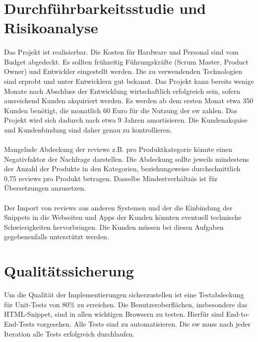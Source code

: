 \documentclass{article}
\begin{document}
\section{Durchführbarkeitsstudie und Risikoanalyse}
\paragraph{}
Das Projekt ist realisierbar. Die Kosten für Hardware und Personal sind vom Budget abgedeckt. Es sollten frühzeitig Führungskräfte (Scrum Master, Product Owner) und Entwickler eingestellt werden. Die zu verwendenden Technologien sind erprobt und unter Entwicklern gut bekannt. Das Projekt kann bereits wenige Monate nach Abschluss der Entwicklung wirtschaftlich erfolgreich sein, sofern ausreichend Kunden akquiriert werden. Es werden ab dem ersten Monat etwa 350 Kunden benötigt, die monatlich 60 Euro für die Nutzung der \gls{sw} zahlen. Das Projekt wird sich dadurch nach etwa 9 Jahren amortisieren. Die Kundenakquise und Kundenbindung sind daher genau zu kontrollieren.

\paragraph{}
Mangelnde Abdeckung der \gls{review}s z.B. pro Produktkategorie könnte einen Negativfaktor der Nachfrage darstellen. Die Abdeckung sollte jeweils mindestens  der Anzahl der Produkte in den Kategorien, beziehungsweise durchschnittlich 0,75 \gls{review}s pro Produkt betragen. Dasselbe Mindestverhältnis ist für Übersetzungen anzusetzen.

\paragraph{}
Der Import von \gls{review}s aus anderen Systemen und der die Einbindung der Snippets in die Webseiten und Apps der Kunden könnten eventuell technische Schwierigkeiten hervorbringen. Die Kunden müssen bei diesen Aufgaben gegebenenfalls unterstützt werden.

\section{Qualitätssicherung}
Um die Qualität der Implementierungen sicherzustellen ist  eine Testabdeckung für Unit-Tests von 80\% zu erreichen. Die Benutzeroberflächen, insbesondere das HTML-Snippet, sind in allen wichtigen Browsern zu testen. Hierfür sind End-to-End-Tests vorgesehen. Alle Tests sind zu automatisieren. Die \gls{sw} muss nach jeder Iteration alle Tests erfolgreich durchlaufen.
\end{document}
